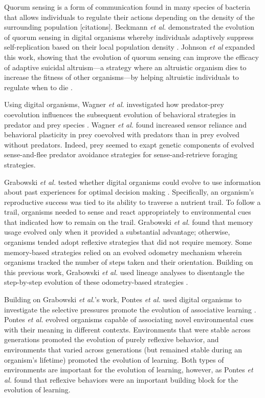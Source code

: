 Quorum sensing is a form of communication found in many species of bacteria that allows individuals to regulate their actions depending on the density of the surrounding population [citations].
Beckmann \textit{et al.} demonstrated the evolution of quorum sensing in digital organisms whereby individuals adaptively suppress self-replication based on their local population density \citep{beckmann_evolving_2009,beckmann_evolution_2012}.
Johnson \textit{et al} expanded this work, showing that the evolution of quorum sensing can improve the efficacy of adaptive suicidal altruism---a strategy where an altruistic organism dies to increase the fitness of other organisms---by helping altruistic individuals to regulate when to die \citep{johnson_more_2014}.  

Using digital organisms, Wagner \textit{et al.} investigated how predator-prey coevolution influences the subsequent evolution of behavioral strategies in predator and prey species \citep{wagner_behavioral_2014}.
Wagner \textit{et al.} found increased sensor reliance and behavioral plasticity in prey coevolved with predators than in prey evolved without predators. 
Indeed, prey seemed to exapt genetic components of evolved sense-and-flee predator avoidance strategies for sense-and-retrieve foraging strategies.

Grabowski \textit{et al.} tested whether digital organisms could evolve to use information about past experiences for optimal decision making \citep{grabowski2010early}. 
Specifically, an organism's reproductive success was tied to its ability to traverse a nutrient trail.
To follow a trail, organisms needed to sense and react appropriately to environmental cues that indicated how to remain on the trail.
Grabowski \textit{et al.} found that memory usage evolved only when it provided a substantial advantage; otherwise, organisms tended adopt reflexive strategies that did not require memory.
Some memory-based strategies relied on an evolved odometry mechanism wherein organisms tracked the number of steps taken and their orientation.
Building on this previous work, Grabowski \textit{et al.} used lineage analyses to disentangle the step-by-step evolution of these odometry-based strategies \citep{grabowski_case_2013}. 

Building on Grabowski \textit{et al.}'s work, Pontes \textit{et al.} used digital organisms to investigate the selective pressures promote the evolution of associative learning \citep{pontes_investigations_2017,pontes_evolutionary_2019}.
Pontes \textit{et al.} evolved organisms capable of associating novel environmental cues with their meaning in different contexts.
Environments that were stable across generations promoted the evolution of purely reflexive behavior, and environments that varied across generations (but remained stable during an organism's lifetime) promoted the evolution of learning.
Both types of environments are important for the evolution of learning, however, as Pontes \textit{et al.} found that reflexive behaviors were an important building block for the evolution of learning.  

